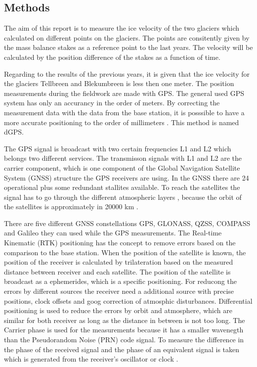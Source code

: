 
\subsection{Methods}\label{GPS:subsec:methods}

The aim of this report is to measure the ice velocity of the two glaciers which calculated on different points on the glaciers. 
The points are consitently given by the mass balance stakes as a reference point to the last years.
The velocity will be calculated by the position difference of the stakes as a function of time.

Regarding to the results of the previous years, it is given that the ice velocity for the glaciers Tellbreen and Blekumbreen is less then one meter.
The position measurements during the fieldwork are made with GPS. 
The general used GPS system has only an accurancy in the order of meters.
By correcting the measurement data with the data from the base station, it is posssible to have a more accurate positioning to the order of millimeters \citep{UGPS}. This method is named dGPS.
\medskip

The GPS signal is broadcast with two certain frequencies L1 and L2 which belongs two different services.
The transmisson signals with L1 and L2 are the carrier component, which is one component of the Global Navigation Satellite System (GNSS) structure the GPS receivers are using.
In the GNSS there are 24 operational plus some redundant stallites available.
To reach the satellites the signal has to go through the different atmospheric layers \citep{curcherdgps}, because the orbit of the satellites is approximately in 20000 km \citep{Trprocess}.
\medskip

There are five different GNSS constellations GPS, GLONASS, QZSS, COMPASS and Galileo they can used while the GPS measurements.
The Real-time Kinematic (RTK) positioning has the concept to remove errors based on the comparison to the base station.
When the position of the satellite is known, the position of the receiver is calculated by trilateration based on the measured distance between receiver and each satellite.
The position of the satellite is broadcast as a ephemerides, which is a specific positioning.
For reducong the errors by different sources the receiver need a additional source with precise positions, clock offsets and goog correction of atmosphic disturbances. 
Differential positioning is used to reduce the errors by orbit and atmosphere, which are similar for both receiver as long as the distance in between is not too long. 
The Carrier phase is used for the measurements because it has a smaller wavenegth than the Pseudorandom Noise (PRN) code signal.
To measure the difference in the phase of the received signal and the phase of an equivalent signal is taken which is generated from the receiver’s oscillator or clock \citep{Trprocess}.
\medskip


